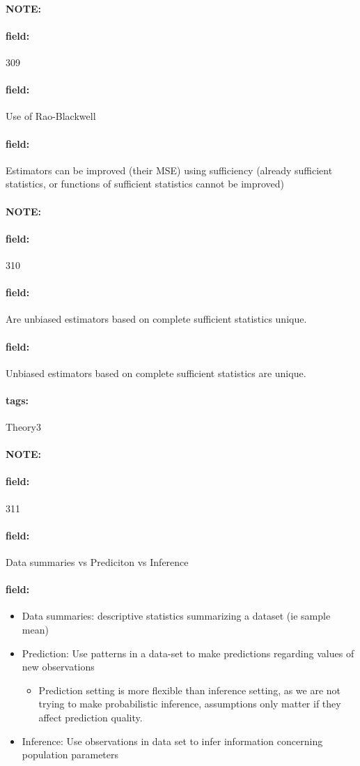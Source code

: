 \documentclass[12pt]{article}
\newenvironment{note}{\paragraph{NOTE:}}{}
\newenvironment{field}{\paragraph{field:}}{}
\newcommand*{\tags}[1]{\paragraph{tags: }#1}
\begin{document}
\begin{note} \begin{field} \tiny 309 \end{field}
  \begin{field}
    Use of Rao-Blackwell
  \end{field}
  \begin{field}
    Estimators can be improved (their MSE) using sufficiency (already sufficient statistics, or functions of sufficient statistics cannot be improved)
  \end{field}
\end{note}

\begin{note} \begin{field} \tiny 310 \end{field}
  \begin{field}
    Are unbiased estimators based on complete sufficient statistics unique.
  \end{field}
  \begin{field}
    Unbiased estimators based on complete sufficient statistics are unique.
  \end{field}
\end{note}




\tags{Theory3}

\begin{note}
    \begin{field}
        \tiny 311
    \end{field}
    \begin{field}
        Data summaries vs Prediciton vs Inference
    \end{field}
    \begin{field}
        \begin{itemize}
          \item Data summaries: descriptive statistics summarizing a dataset (ie sample mean)
          \item Prediction: Use patterns in a data-set to make predictions regarding values of new observations
          \begin{itemize}
            \item Prediction setting is more flexible than inference setting, as we are not trying to make probabilistic inference, assumptions only matter if they affect prediction quality.
          \end{itemize}
          \item Inference: Use observations in data set to infer information concerning population parameters
        \end{itemize}
    \end{field}
\end{note}
\end{document}
